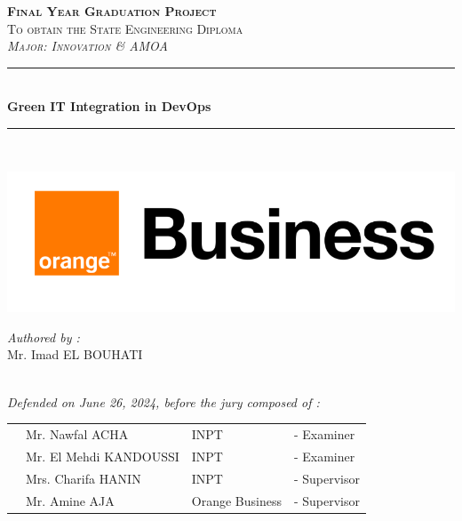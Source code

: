 \vspace{0.9cm}
\begin{center}
{\large \textsc{\textbf{Final Year Graduation Project}}}\\[0.1cm]
{\large \textsc{To obtain the State Engineering Diploma}}\\[0.1cm]
{\large \textsc{\textit{Major: Innovation \& AMOA}}} \\[0.05cm] 
\vspace{-0.04cm}
\rule{\linewidth}{0.3mm} \\[0.4cm]   %
 { \huge \textbf{ Green IT Integration in DevOps }} \\[0.15cm] 
\rule{\linewidth}{0.3mm} \\[0.4cm]
\vspace{0.4cm}

\includegraphics[scale=0.28]{Logos/ob.png}  %

\vspace{1cm}

\noindent
\begin{minipage}{0.9\textwidth}
    \vspace{-7mm}
  \begin{flushleft} \large
    \emph{Authored by :}\\
    Mr. Imad \textsc{EL BOUHATI} %
  \end{flushleft}
\end{minipage}
\begin{minipage}{0.4\textwidth}

\end{minipage}\\[0.6cm]

{\large \textit{Defended on June 26, 2024, before the jury composed of :}}\\[0.5cm]


\begin{tabular}{p{1cm}lll}
 & \large Mr. Nawfal \textsc{ACHA}  & \large INPT & \large - Examiner \\[0.1cm]
 & \large Mr. El Mehdi \textsc{KANDOUSSI}  & \large INPT & \large - Examiner \\[0.1cm]
 & \large Mrs. Charifa \textsc{HANIN}  & \large INPT & \large - Supervisor \\[0.1cm]
  & \large Mr. Amine \textsc{AJA}  & \large Orange Business & \large - Supervisor \\[0.1cm]
 

\end{tabular}
\end{center}
